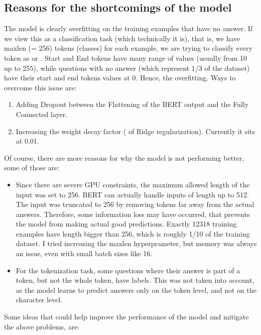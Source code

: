 \documentclass[12pt]{report}
\begin{document}
\subsection*{Reasons for the shortcomings of the model}
The model is clearly overfitting on the training examples that have no answer.
If we view this as a classification task (which technically it is), that is,
we have maxlen (= 256) tokens (classes) for each example, we are trying to
classify every token as  or . Start
and End tokens have many range of values (usually from 10 up to 255), while questions
with no answer (which represent 1/3 of the dataset) have their start and end tokens values
at 0. Hence, the overfitting. Ways to overcome this issue are:
\begin{enumerate}
    \item Adding Dropout between the Flattening of the BERT output and the Fully Connected
        layer.
    \item Increasing the weight decay factor ( of Ridge regularization).
        Currently it sits at 0.01.
\end{enumerate}
Of course, there are more reasons for why the model is not performing better, some of
those are:
\begin{itemize}
    \item Since there are severe GPU constraints, the maximum allowed length of the
        input was set to 256. BERT can actually handle inputs of length up to 512.
        The input was truncated to 256 by removing tokens far away from the actual answers.
        Therefore, some information loss may have occurred, that prevents the model from
        making actual good predictions. Exactly 12318 training examples have length
        bigger than 256, which is roughly 1/10 of the training dataset. I tried increasing
        the maxlen hyperprameter, but memory was always an issue, even with small batch sizes
        like 16.
    \item For the tokenization task, some questions where their answer is part
        of a token, but not the whole token, have  labels. This was
        not taken into account, as the model learns to predict answers only on the
        token level, and not on the character level.
\end{itemize}
Some ideas that could help improve the performance of the model and mitigate the above
problems, are:
\end{document}
